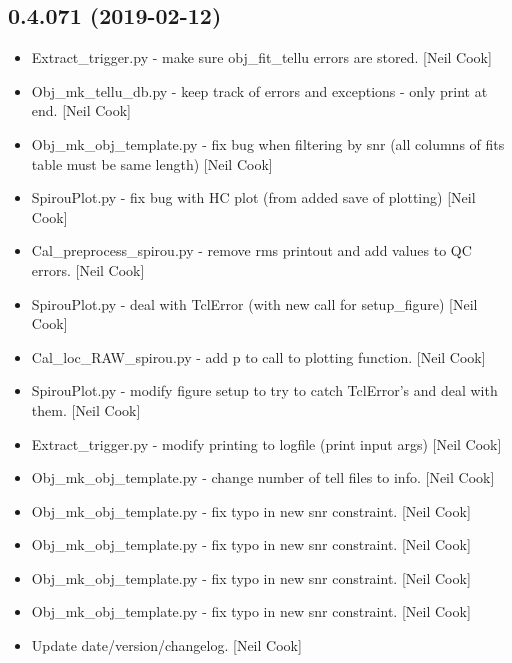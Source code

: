 \documentclass[a4paper,10pt,english]{report}
\begin{document}
\subsection{0.4.071 (2019-02-12)}
\label{\detokenize{misc/changelog:id185}}\begin{itemize}
\item {} 
Extract\_trigger.py - make sure obj\_fit\_tellu errors are stored. {[}Neil
Cook{]}

\item {} 
Obj\_mk\_tellu\_db.py - keep track of errors and exceptions - only print
at end. {[}Neil Cook{]}

\item {} 
Obj\_mk\_obj\_template.py - fix bug when filtering by snr (all columns of
fits table must be same length) {[}Neil Cook{]}

\item {} 
SpirouPlot.py - fix bug with HC plot (from added save of plotting)
{[}Neil Cook{]}

\item {} 
Cal\_preprocess\_spirou.py - remove rms printout and add values to QC
errors. {[}Neil Cook{]}

\item {} 
SpirouPlot.py - deal with TclError (with new call for setup\_figure)
{[}Neil Cook{]}

\item {} 
Cal\_loc\_RAW\_spirou.py - add p to call to plotting function. {[}Neil
Cook{]}

\item {} 
SpirouPlot.py - modify figure setup to try to catch TclError’s and
deal with them. {[}Neil Cook{]}

\item {} 
Extract\_trigger.py - modify printing to logfile (print input args)
{[}Neil Cook{]}

\item {} 
Obj\_mk\_obj\_template.py - change number of tell files to info. {[}Neil
Cook{]}

\item {} 
Obj\_mk\_obj\_template.py - fix typo in new snr constraint. {[}Neil Cook{]}

\item {} 
Obj\_mk\_obj\_template.py - fix typo in new snr constraint. {[}Neil Cook{]}

\item {} 
Obj\_mk\_obj\_template.py - fix typo in new snr constraint. {[}Neil Cook{]}

\item {} 
Obj\_mk\_obj\_template.py - fix typo in new snr constraint. {[}Neil Cook{]}

\item {} 
Update date/version/changelog. {[}Neil Cook{]}

\end{itemize}
\end{document}
